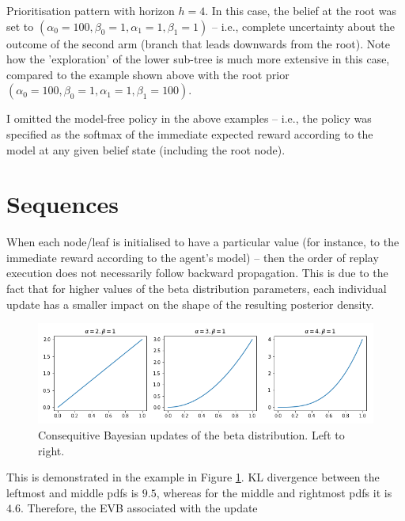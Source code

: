\documentclass{article}
\begin{document}


\newpage
Prioritisation pattern with horizon $h=4$. In this case, the belief at the root was set to 
$(\alpha_0=100, \beta_0=1, \alpha_1=1, \beta_1=1)$ -- i.e., complete uncertainty about 
the outcome of the second arm (branch that leads downwards from the root). Note how the 
'exploration' of the lower sub-tree is much more extensive in this case, compared to the 
example shown above with the root prior $(\alpha_0=100, \beta_0=1, \alpha_1=1, \beta_1=100)$.
\vspace{1cm}



\newpage
I omitted the model-free policy in the above examples -- i.e., the policy was specified as the 
softmax of the immediate expected reward according to the model at any given belief state 
(including the root node). 

\section*{Sequences}
When each node/leaf is initialised to have a particular value (for instance, to the immediate 
reward according to the agent's model) -- then the order of replay execution does not necessarily 
follow backward propagation. This is due to the fact that for higher values of the beta distribution 
parameters, each individual update has a smaller impact on the shape of the resulting posterior density. 

\begin{figure}[h!]
    \centering
    \includegraphics[width=1\textwidth]{../data/betas.png}
    \caption{Consequitive Bayesian updates of the beta distribution. Left to right.}
    \label{fig1}
\end{figure}

This is demonstrated in the example in Figure \ref{fig1}. KL divergence between the 
leftmost and middle pdfs is $9.5$, whereas for the middle and rightmost pdfs it is $4.6$.
Therefore, the EVB associated with the update 
\end{document}
